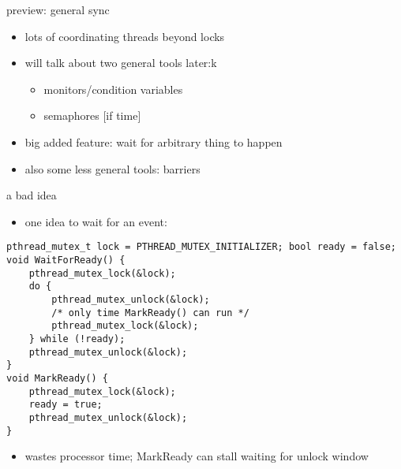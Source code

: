 \begin{frame}{preview: general sync}
    \begin{itemize}
    \item lots of coordinating threads beyond locks
    \item will talk about two general tools later:k
        \begin{itemize}
        \item monitors/condition variables
        \item semaphores [if time]
        \end{itemize}
    \item big added feature: wait for arbitrary thing to happen
    \vspace{.5cm}
    \item also some less general tools: barriers
    \end{itemize}
\end{frame}

\begin{frame}[fragile]{a bad idea}
\begin{itemize}
\item one  idea to wait for an event:
\end{itemize}
\begin{lstlisting}[style=size105]
pthread_mutex_t lock = PTHREAD_MUTEX_INITIALIZER; bool ready = false;
void WaitForReady() {
    pthread_mutex_lock(&lock);
    do {
        pthread_mutex_unlock(&lock);
        /* only time MarkReady() can run */
        pthread_mutex_lock(&lock);
    } while (!ready);
    pthread_mutex_unlock(&lock);
}
void MarkReady() {
    pthread_mutex_lock(&lock);
    ready = true;
    pthread_mutex_unlock(&lock);
}
\end{lstlisting}
\begin{itemize}
\item wastes processor time; MarkReady can stall waiting for unlock window
\end{itemize}
\end{frame}
